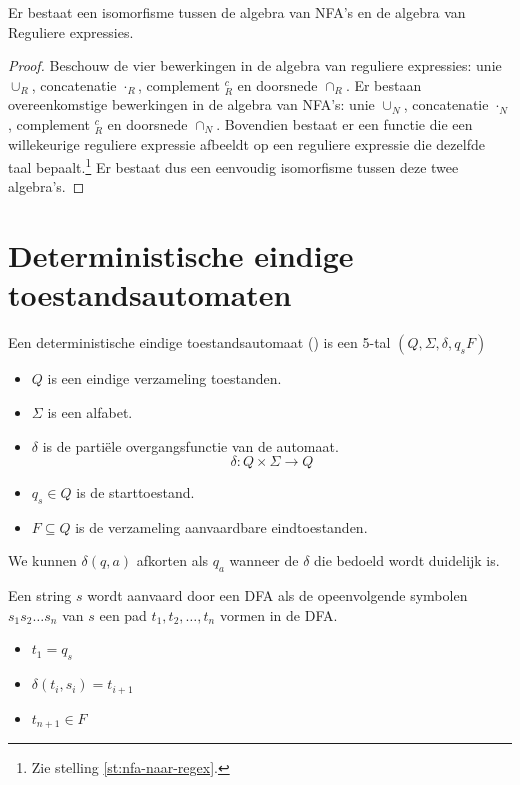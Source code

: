 \documentclass[main.tex]{subfiles}
\begin{document}
\begin{ei}
  Er bestaat een isomorfisme tussen de algebra van NFA's en de algebra van Reguliere expressies.

  \begin{proof}
    Beschouw de vier bewerkingen in de algebra van reguliere expressies: unie $\cup_{R}$, concatenatie $\cdot_{R}$, complement $^{c}_{R}$ en doorsnede $\cap_{R}$.
    Er bestaan overeenkomstige bewerkingen in de algebra van NFA's: unie $\cup_{N}$, concatenatie $\cdot_{N}$, complement $^{c}_{R}$ en doorsnede $\cap_{N}$.
    Bovendien bestaat er een functie die een willekeurige reguliere expressie afbeeldt op een reguliere expressie die dezelfde taal bepaalt.\footnote{Zie stelling \ref{st:nfa-naar-regex}.}
    Er bestaat dus een eenvoudig isomorfisme tussen deze twee algebra's.
  \end{proof}
\end{ei}

\section{Deterministische eindige toestandsautomaten}
\begin{de}
  Een deterministische eindige toestandsautomaat () is een 5-tal $(Q,\Sigma,\delta,q_{s}F)$
  \begin{itemize}
  \item $Q$ is een eindige verzameling toestanden.
  \item $\Sigma$ is een alfabet.
  \item $\delta$ is de parti\"ele overgangsfunctie van de automaat.
  \[ \delta: Q \times \Sigma \rightarrow Q \]
  \item $q_{s} \in Q$ is de starttoestand.
  \item $F \subseteq Q$ is de verzameling aanvaardbare eindtoestanden.
  \end{itemize}
\end{de}

\begin{de}
  We kunnen $\delta(q,a)$ afkorten als $q_{a}$ wanneer de $\delta$ die bedoeld wordt duidelijk is.  
\end{de}

\begin{de}
  Een string $s$ wordt aanvaard door een DFA als de opeenvolgende symbolen $s_{1}s_{2}\dotsc s_{n}$ van $s$ een pad $t_{1},t_{2},\dotsc,t_{n}$ vormen in de DFA.
  \begin{itemize}
  \item $t_{1} = q_{s}$
  \item $\delta(t_{i},s_{i}) = t_{i+1}$
  \item $t_{n+1} \in F$
  \end{itemize}
\end{de}
\end{document}
